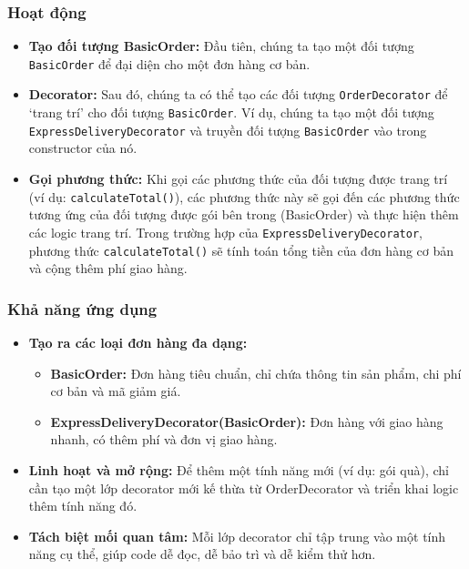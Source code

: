\subsubsection{Hoạt động}
\begin{flushleft}
    \begin{itemize}
        \item \textbf{Tạo đối tượng BasicOrder:} Đầu tiên, chúng ta tạo một đối tượng \verb|BasicOrder| để đại diện cho một đơn hàng cơ bản.
        \item \textbf{Decorator:} Sau đó, chúng ta có thể tạo các đối tượng \verb|OrderDecorator| để `trang trí' cho đối tượng \verb|BasicOrder|. Ví dụ, chúng ta tạo một đối tượng \verb|ExpressDeliveryDecorator| và truyền đối tượng \verb|BasicOrder| vào trong constructor của nó.
        \item \textbf{Gọi phương thức:} Khi gọi các phương thức của đối tượng được trang trí (ví dụ: \verb|calculateTotal()|), các phương thức này sẽ gọi đến các phương thức tương ứng của đối tượng được gói bên trong (BasicOrder) và thực hiện thêm các logic trang trí. Trong trường hợp của \verb|ExpressDeliveryDecorator|, phương thức \verb|calculateTotal()| sẽ tính toán tổng tiền của đơn hàng cơ bản và cộng thêm phí giao hàng.
    \end{itemize}
\end{flushleft}

\subsubsection{Khả năng ứng dụng}
\begin{flushleft}
    \begin{itemize}
        \item \textbf{Tạo ra các loại đơn hàng đa dạng:}
              \begin{itemize}
                  \item \textbf{BasicOrder:} Đơn hàng tiêu chuẩn, chỉ chứa thông tin sản phẩm, chi phí cơ bản và mã giảm giá.
                  \item \textbf{ExpressDeliveryDecorator(BasicOrder):} Đơn hàng với giao hàng nhanh, có thêm phí và đơn vị giao hàng.
              \end{itemize}
        \item \textbf{Linh hoạt và mở rộng:} Để thêm một tính năng mới (ví dụ: gói quà), chỉ cần tạo một lớp decorator mới kế thừa từ OrderDecorator và triển khai logic thêm tính năng đó.
        \item \textbf{Tách biệt mối quan tâm:} Mỗi lớp decorator chỉ tập trung vào một tính năng cụ thể, giúp code dễ đọc, dễ bảo trì và dễ kiểm thử hơn.
    \end{itemize}
\end{flushleft}

